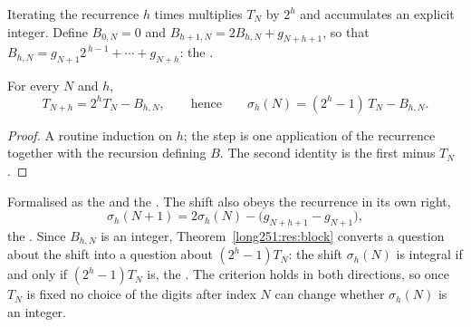 \documentclass[11pt]{article}
\begin{document}
Iterating the recurrence $h$ times multiplies $T_N$ by $2^{h}$ and accumulates
an explicit integer.  Define $B_{0,N}=0$ and $B_{h+1,N}=2B_{h,N}+g_{N+h+1}$,
so that $B_{h,N}=g_{N+1}2^{\,h-1}+\cdots+g_{N+h}$: the
.

\begin{theorem}\label{long251:res:block}
For every $N$ and $h$,
\[
 T_{N+h}=2^{h}T_N-B_{h,N},
 \qquad\text{hence}\qquad
 \sigma_h(N)=(2^{h}-1)\,T_N-B_{h,N} .
\]
\end{theorem}

\begin{proof}
A routine induction on $h$; the step is one application of the recurrence
together with the recursion defining $B$.  The second identity is the first
minus $T_N$.
\end{proof}

\noindent Formalised as the
 and the
.  The shift also obeys the recurrence in its own right,
\begin{equation}\label{long251:eq:shift-step}
 \sigma_h(N+1)=2\sigma_h(N)-\bigl(g_{N+h+1}-g_{N+1}\bigr),
\end{equation}
the
.  Since $B_{h,N}$ is an integer, Theorem~\ref{long251:res:block} converts a
question about the shift into a question about $(2^{h}-1)T_N$: the shift
$\sigma_h(N)$ is integral if and only if $(2^{h}-1)T_N$ is, the
.  The criterion holds in both directions, so once
$T_N$ is fixed no choice of the digits after index $N$ can change whether
$\sigma_h(N)$ is an integer.
\end{document}
